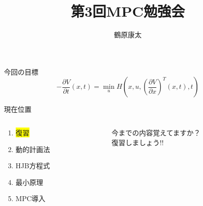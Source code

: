 \documentclass[twocolumn, dvipdfmx,12pt]{beamer}
\title{第3回MPC勉強会}
\author{鶴原康太}
\begin{document}
    \frame{\maketitle}

    \begin{frame}{今回の目標}
        \begin{equation*}
            -\frac{\partial V}{\partial t}\left(x,t\right) = \min _u H\left(x, u, \left( \frac{\partial V}{\partial x} \right)^T\left(x, t\right), t \right)
        \end{equation*}
    \end{frame}

    \begin{frame}{現在位置}
        \begin{columns}
            \begin{column}{.4\textwidth}
                \begin{enumerate}
                    \item \colorbox{yellow}{復習}
                    \item 動的計画法
                    \item HJB方程式
                    \item 最小原理
                    \item MPC導入
                \end{enumerate}
            \end{column}
    
            \begin{column}{.6\textwidth}
                今までの内容覚えてますか？\\
                復習しましょう!!
            \end{column}
        \end{columns}
    \end{frame}
\end{document}
